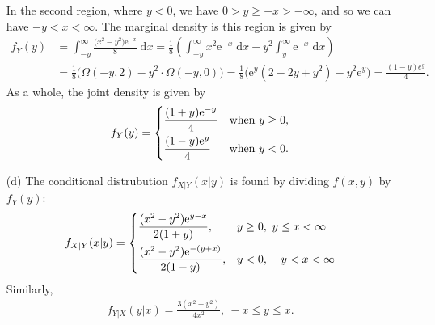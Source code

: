 \documentclass[10pt]{article}
\begin{document}
\begin{itemize}
    In the second region, where \(y < 0\), we have \(0 > y \ge -x > - \infty\), and so we can have \(-y < x < \infty\). 
    The marginal density is this region is given by 
    \begin{align*}
        f_Y(y) &= \int_{-y}^{\infty} \frac{\big( x^2 - y^2 \big) \mathrm{e}^{-x}}{8} \;\mathrm{d}x
        = \frac{1}{8} \left( \int_{-y}^{\infty} x^2 \mathrm{e}^{-x} \;\mathrm{d}x - y^2 \int_y^{\infty} \mathrm{e}^{-x} \;\mathrm{d}x \right) \\
        &= \frac{1}{8} \big( \Omega(-y,2) - y^2 \cdot \Omega(-y,0) \big)
        = \frac{1}{8} \big( \mathrm{e}^{y}(2 - 2y + y^2) - y^2\mathrm{e}^{y} \big)
        = \frac{(1 - y) e^{y}}{4}.
    \end{align*}
    As a whole, the joint density is given by 
    \begin{align*}
        f_Y(y) = \begin{dcases}
            \frac{(1 + y)\mathrm{e}^{-y}}{4} & \text{when \(y \ge 0\)}, \\
            \frac{(1 - y)\mathrm{e}^{y}}{4}  & \text{when \(y < 0\)}. \\
        \end{dcases}
    \end{align*}
    \item[(d)] The conditional distrubution \(f_{X|Y}(x|y)\) is found by dividing \(f(x,y)\) by \(f_Y(y)\):
    \begin{align*}
        f_{X|Y}(x|y) = \begin{dcases}
            \frac{(x^2 - y^2)\mathrm{e}^{y-x}}{2(1+y)},    & y \ge 0,~  y \le x < \infty \\
            \frac{(x^2 - y^2)\mathrm{e}^{-(y+x)}}{2(1-y)}, & y < 0,~    -y < x < \infty
        \end{dcases}
    \end{align*}
    Similarly, 
    \begin{align*}
        f_{Y|X}(y|x) = \frac{3(x^2 - y^2)}{4x^2}, ~ -x \le y \le x.
    \end{align*}
\end{itemize}
\end{document}
